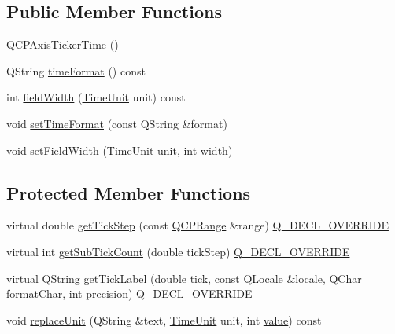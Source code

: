 \subsection*{Public Member Functions}
\begin{DoxyCompactItemize}
\item 
\mbox{\hyperlink{class_q_c_p_axis_ticker_time_a5145aac1d2117fdac411d9e8552cc41b}{Q\+C\+P\+Axis\+Ticker\+Time}} ()
\item 
Q\+String \mbox{\hyperlink{class_q_c_p_axis_ticker_time_a99ad61dc7434a7fed1850e96bf748834}{time\+Format}} () const
\item 
int \mbox{\hyperlink{class_q_c_p_axis_ticker_time_a6b58a98e4d64c6764aa61a707e4a344d}{field\+Width}} (\mbox{\hyperlink{class_q_c_p_axis_ticker_time_a5c48ded8c6d3a1aca9b68219469fea3e}{Time\+Unit}} unit) const
\item 
void \mbox{\hyperlink{class_q_c_p_axis_ticker_time_a2f30b6e5125bce4256be9ce3177088ea}{set\+Time\+Format}} (const Q\+String \&format)
\item 
void \mbox{\hyperlink{class_q_c_p_axis_ticker_time_adc13e54fc969be98a5c0e3fa0dbaa293}{set\+Field\+Width}} (\mbox{\hyperlink{class_q_c_p_axis_ticker_time_a5c48ded8c6d3a1aca9b68219469fea3e}{Time\+Unit}} unit, int width)
\end{DoxyCompactItemize}
\subsection*{Protected Member Functions}
\begin{DoxyCompactItemize}
\item 
virtual double \mbox{\hyperlink{class_q_c_p_axis_ticker_time_a5615064642090fe193797caea8b98cb4}{get\+Tick\+Step}} (const \mbox{\hyperlink{class_q_c_p_range}{Q\+C\+P\+Range}} \&range) \mbox{\hyperlink{qcustomplot_8h_a42cc5eaeb25b85f8b52d2a4b94c56f55}{Q\+\_\+\+D\+E\+C\+L\+\_\+\+O\+V\+E\+R\+R\+I\+DE}}
\item 
virtual int \mbox{\hyperlink{class_q_c_p_axis_ticker_time_acace84c46598176aa53837e147595471}{get\+Sub\+Tick\+Count}} (double tick\+Step) \mbox{\hyperlink{qcustomplot_8h_a42cc5eaeb25b85f8b52d2a4b94c56f55}{Q\+\_\+\+D\+E\+C\+L\+\_\+\+O\+V\+E\+R\+R\+I\+DE}}
\item 
virtual Q\+String \mbox{\hyperlink{class_q_c_p_axis_ticker_time_a046eb771bdf2a959f570db542b3a0be6}{get\+Tick\+Label}} (double tick, const Q\+Locale \&locale, Q\+Char format\+Char, int precision) \mbox{\hyperlink{qcustomplot_8h_a42cc5eaeb25b85f8b52d2a4b94c56f55}{Q\+\_\+\+D\+E\+C\+L\+\_\+\+O\+V\+E\+R\+R\+I\+DE}}
\item 
void \mbox{\hyperlink{class_q_c_p_axis_ticker_time_a03b6c980be36f2672e3fc31d109a28a0}{replace\+Unit}} (Q\+String \&text, \mbox{\hyperlink{class_q_c_p_axis_ticker_time_a5c48ded8c6d3a1aca9b68219469fea3e}{Time\+Unit}} unit, int \mbox{\hyperlink{diffusion_8cpp_a4b41795815d9f3d03abfc739e666d5da}{value}}) const
\end{DoxyCompactItemize}
